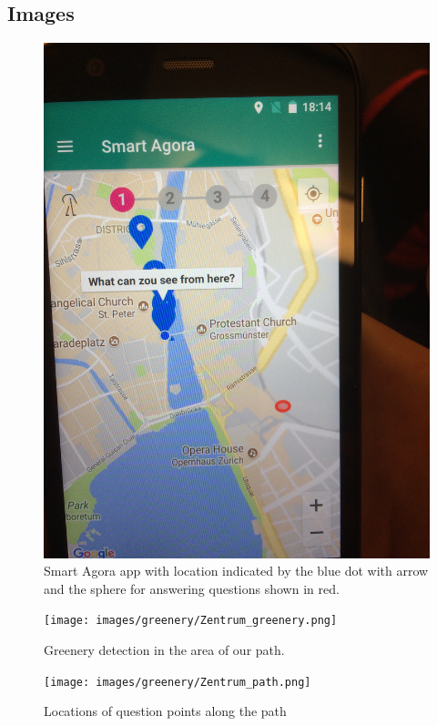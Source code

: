 \documentclass[letterpaper]{article}
\begin{document}
\subsection{Images}

\begin{figure}[htb]
    \centering
    \includegraphics[width=\columnwidth, rotate=270]{images/SmartAgora/img_6.jpg}
    \caption{Smart Agora app with location indicated by the blue dot with arrow and the sphere for answering questions shown in red.}
    \label{fig:smart_agora_1}
\end{figure}

\begin{figure}[htb]
    \centering
    \texttt{[image: images/greenery/Zentrum\_greenery.png]}
    \caption{Greenery detection in the area of our path.}
    \label{fig:path_greenery}
\end{figure}

\begin{figure}[htb]
	\centering
	\texttt{[image: images/greenery/Zentrum\_path.png]}
	\caption{Locations of question points along the path}
	\label{fig:path_points}
\end{figure}
\end{document}
